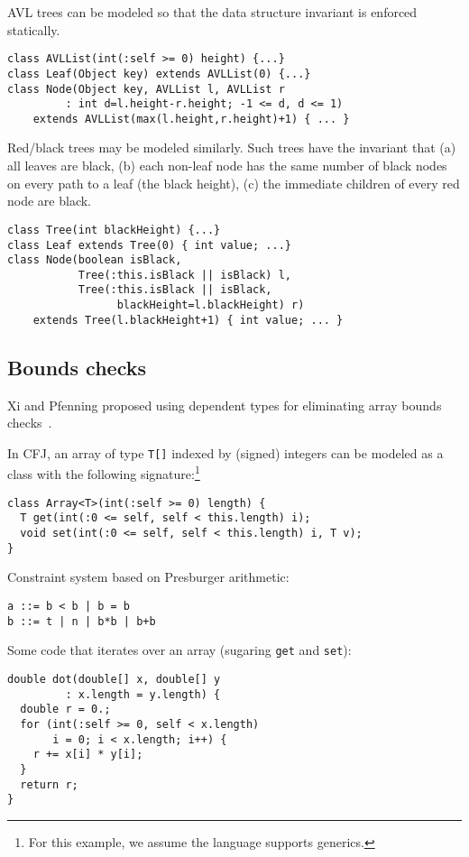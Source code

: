 AVL trees can be modeled so that the data structure invariant is
enforced statically.

{\footnotesize
\begin{verbatim}
class AVLList(int(:self >= 0) height) {...}
class Leaf(Object key) extends AVLList(0) {...}
class Node(Object key, AVLList l, AVLList r
         : int d=l.height-r.height; -1 <= d, d <= 1) 
    extends AVLList(max(l.height,r.height)+1) { ... }
\end{verbatim}}

Red/black trees may be modeled similarly. Such trees have the
invariant that (a) all leaves are black, (b) each non-leaf node has
the same number of black nodes on every path to a leaf (the black
height), (c) the immediate children of every red node are black.
{\footnotesize
\begin{verbatim}
class Tree(int blackHeight) {...}
class Leaf extends Tree(0) { int value; ...}
class Node(boolean isBlack, 
           Tree(:this.isBlack || isBlack) l, 
           Tree(:this.isBlack || isBlack,
                 blackHeight=l.blackHeight) r)
    extends Tree(l.blackHeight+1) { int value; ... }
\end{verbatim}}

\subsection{Bounds checks}

Xi and Pfenning proposed using dependent types for eliminating
array bounds checks~\cite{xi98array}.

In CFJ, an array of type {\tt T[]} indexed by (signed) integers
can be modeled as a class with the following
signature:\footnote{For this example, we assume the language supports generics.}
\begin{verbatim}
class Array<T>(int(:self >= 0) length) {
  T get(int(:0 <= self, self < this.length) i);
  void set(int(:0 <= self, self < this.length) i, T v);
}
\end{verbatim}

Constraint system based on Presburger arithmetic:
\begin{verbatim}
a ::= b < b | b = b
b ::= t | n | b*b | b+b
\end{verbatim}

Some code that iterates over an array (sugaring {\tt get} and {\tt set}):
\begin{verbatim}
double dot(double[] x, double[] y
         : x.length = y.length) {
  double r = 0.; 
  for (int(:self >= 0, self < x.length)
       i = 0; i < x.length; i++) {
    r += x[i] * y[i];
  }
  return r;
}
\end{verbatim}

